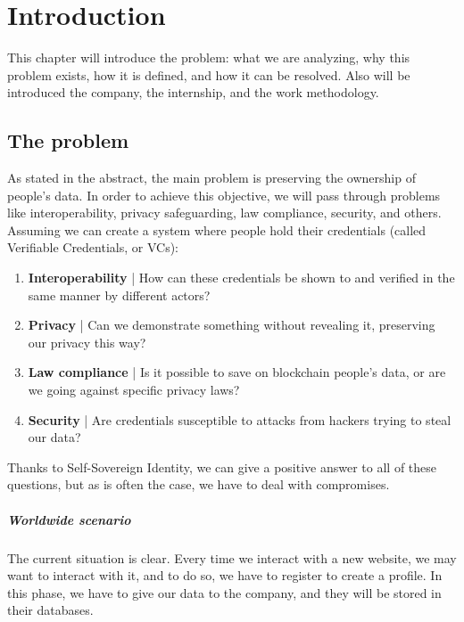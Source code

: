 
\chapter{Introduction}
This chapter will introduce the problem: what we are analyzing, why 
this problem exists, how it is defined, and how it can be resolved. 
Also will be introduced the company, the internship, and the work 
methodology.
\section{The problem}
As stated in the abstract, the main problem is preserving the ownership 
of people's data. In order to achieve this objective, we will pass through 
problems like interoperability, privacy safeguarding, law compliance, security,
and others.
\vspace*{0.3cm}\\
Assuming we can create a system where people hold their credentials 
(called Verifiable Credentials, or VCs):
\begin{enumerate}
    \setlength\itemsep{-0.3em}
    \item \textbf{Interoperability} | How can these credentials be shown to and 
    verified in the same manner by different actors?
    \item \textbf{Privacy} | Can we demonstrate something without revealing it, 
    preserving our privacy this way?
    \item \textbf{Law compliance} | Is it possible to save on blockchain people's
    data, or are we going against specific privacy laws?
    \item \textbf{Security} | Are credentials susceptible to attacks from hackers 
    trying to steal our data?
\end{enumerate}
Thanks to Self-Sovereign Identity, we can give a positive answer to all
of these questions, but as is often the case, we have to deal with 
compromises.

\paragraph{Worldwide scenario}
The current situation is clear. Every time we interact with a new website,
we may want to interact with it, and to do so, we have to register to create 
a profile. In this phase, we have to give our data to the company, and they 
will be stored in their databases.

